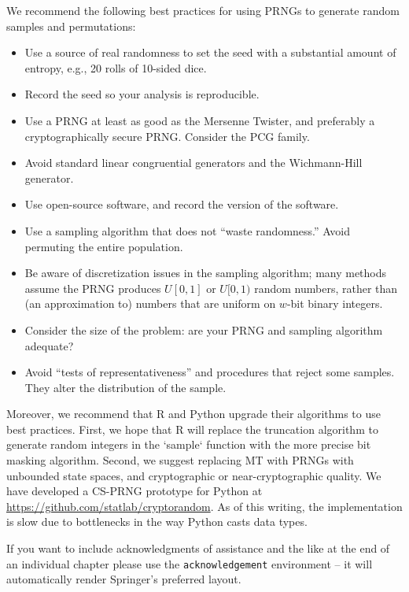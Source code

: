 \documentclass[graybox]{svmult}
\begin{document}
We recommend the following best practices for using PRNGs to generate random samples and permutations:
\begin{itemize}
\item Use a source of real randomness to set the seed with a substantial amount of entropy, e.g., 20 rolls of 10-sided dice.
\item Record the seed so your analysis is reproducible.
\item Use a PRNG at least as good as the Mersenne Twister, and preferably a cryptographically secure PRNG. Consider the PCG family. 
\item Avoid standard linear congruential generators and the Wichmann-Hill generator.
\item Use open-source software, and record the version of the software.
\item Use a sampling algorithm that does not ``waste randomness.'' Avoid permuting the entire population.
\item Be aware of discretization issues in the sampling algorithm; many methods assume the PRNG produces $U[0,1]$ or $U[0,1)$ random numbers, rather than (an approximation to) numbers that are uniform on $w$-bit binary integers.
\item Consider the size of the problem: are your PRNG and sampling algorithm adequate?
\item Avoid ``tests of representativeness'' and procedures that reject some samples. They alter the distribution of the sample.
\end{itemize}


Moreover, we recommend that R and Python upgrade their algorithms to use best practices.
First, we hope that R will replace the truncation algorithm to generate random integers in the `sample` function with the more precise bit masking algorithm.
Second, we suggest replacing MT with PRNGs with unbounded state spaces, and cryptographic or near-cryptographic quality.
We have developed a CS-PRNG prototype for Python at \url{https://github.com/statlab/cryptorandom}.
As of this writing, the implementation is slow due to bottlenecks in the way Python casts data types.




\begin{acknowledgement}
If you want to include acknowledgments of assistance and the like at the end of an individual chapter please use the \verb|acknowledgement| environment -- it will automatically render Springer's preferred layout.
\end{acknowledgement}
%



\end{document}

